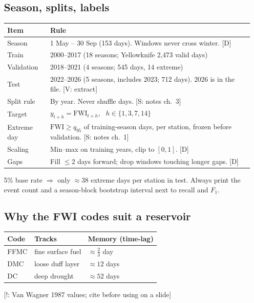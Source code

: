 \documentclass[11pt,a4paper]{article}
\newcommand{\tagbox}[2]{{\footnotesize\color{#1}\textsf{[#2]}}}
\newcommand{\supp}[1]{\tagbox{ForestGreen!70!black}{S: #1}}  %
\newcommand{\veri}[1]{\tagbox{ForestGreen!70!black}{V: #1}}  %
\newcommand{\ours}{\tagbox{NavyBlue}{D}}                      %
\newcommand{\caut}[1]{\tagbox{BrickRed}{!: #1}}               %
\begin{document}
\subsection{Season, splits, labels}
\begin{center}\small
\begin{tabularx}{\linewidth}{@{}l Y@{}}
\toprule
\textbf{Item} & \textbf{Rule}\\
\midrule
Season & 1 May -- 30 Sep (153 days). Windows never cross winter. \ours\\
Train & 2000--2017 (18 seasons; Yellowknife 2{,}473 valid days)\\
Validation & 2018--2021 (4 seasons; 545 days, 14 extreme)\\
Test & 2022--2026 (5 seasons, includes 2023; 712 days). 2026 is in the file. \veri{extract}\\
Split rule & By year. Never shuffle days. \supp{notes ch.~3}\\
Target & $y_{t+h}=\mathrm{FWI}_{t+h}$, \ $h\in\{1,3,7,14\}$\\
Extreme day & $\mathrm{FWI}\ge q_{95}$ of training-season days, per station, frozen before validation. \supp{notes ch.~1}\\
Scaling & Min--max on training years, clip to $[0,1]$. \ours\\
Gaps & Fill $\le2$ days forward; drop windows touching longer gaps. \ours\\
\bottomrule
\end{tabularx}
\end{center}

\begin{watch}
5\% base rate $\Rightarrow$ only $\approx38$ extreme days per station in test. Always print the event count and a
season-block bootstrap interval next to recall and $F_1$.
\end{watch}

\subsection{Why the FWI codes suit a reservoir}
\begin{center}\small
\begin{tabular}{@{}lll@{}}
\toprule
\textbf{Code} & \textbf{Tracks} & \textbf{Memory (time-lag)}\\
\midrule
FFMC & fine surface fuel & $\approx\tfrac23$ day\\
DMC & loose duff layer & $\approx12$ days\\
DC & deep drought & $\approx52$ days\\
\bottomrule
\end{tabular}
\end{center}
\caut{Van Wagner 1987 values; cite before using on a slide}
\end{document}
